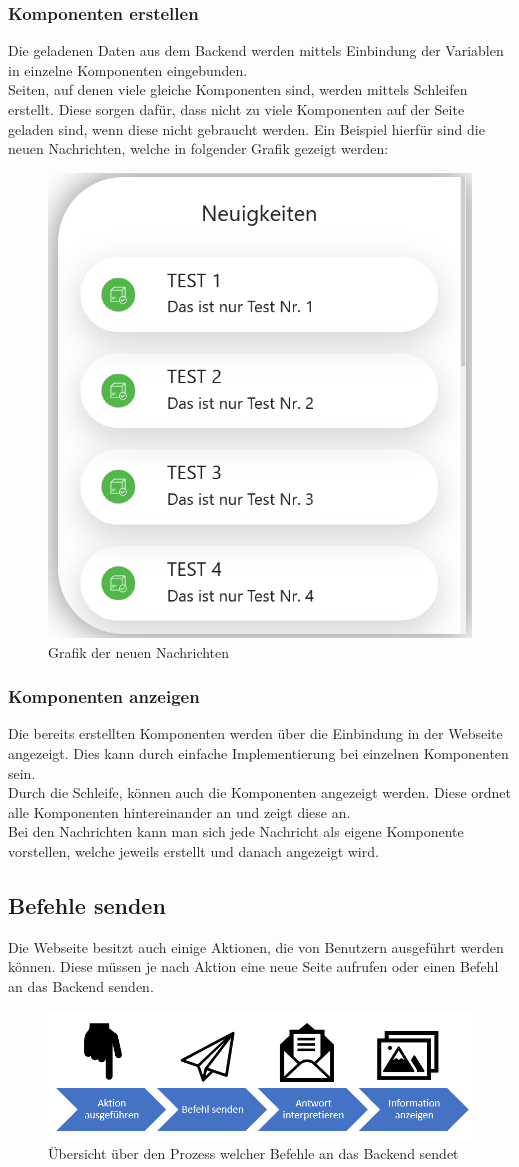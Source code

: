 \subsubsection{Komponenten erstellen}
Die geladenen Daten aus dem Backend werden mittels Einbindung der Variablen in einzelne Komponenten eingebunden.\\
Seiten, auf denen viele gleiche Komponenten sind, werden mittels Schleifen erstellt. Diese sorgen dafür, dass nicht zu viele Komponenten auf der Seite geladen sind, wenn diese nicht gebraucht werden.
Ein Beispiel hierfür sind die neuen Nachrichten, welche in folgender Grafik gezeigt werden:
\begin{figure}[H]
	\centering
	\includegraphics[width=0.3\linewidth]{images/messages_index}
	\caption[Neue Nachrichten]{Grafik der neuen Nachrichten}
	\label{fig:messagesindex}
\end{figure}

\subsubsection{Komponenten anzeigen}
Die bereits erstellten Komponenten werden über die Einbindung in der Webseite angezeigt. Dies kann durch einfache Implementierung bei einzelnen Komponenten sein.\\
Durch die Schleife, können auch die Komponenten angezeigt werden. Diese ordnet alle Komponenten hintereinander an und zeigt diese an.\\
Bei den Nachrichten kann man sich jede Nachricht als eigene Komponente vorstellen, welche jeweils erstellt und danach angezeigt wird.
\subsection{Befehle senden}
Die Webseite besitzt auch einige Aktionen, die von Benutzern ausgeführt werden können. Diese müssen je nach Aktion eine neue Seite aufrufen oder einen Befehl an das Backend senden.

\begin{figure}[H]
	\centering
	\includegraphics[width=0.8\linewidth]{images/Prozess_Befehl_senden}
	\caption[Prozess der Befehlssendung]{Übersicht über den Prozess welcher Befehle an das Backend sendet}
	\label{fig:prozessbefehlsenden}
\end{figure}

